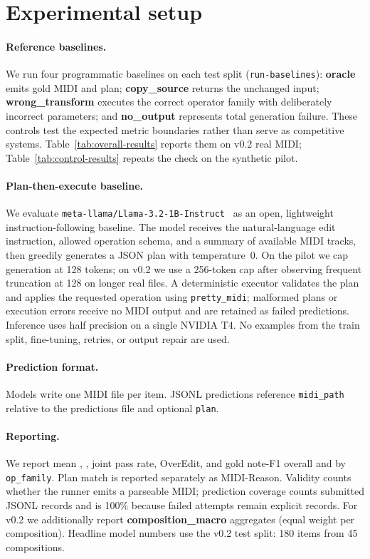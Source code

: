 \section{Experimental setup}

\paragraph{Reference baselines.}
We run four programmatic baselines on each test split (\texttt{run-baselines}): \textbf{oracle} emits gold MIDI and plan; \textbf{copy\_source} returns the unchanged input; \textbf{wrong\_transform} executes the correct operator family with deliberately incorrect parameters; and \textbf{no\_output} represents total generation failure. These controls test the expected metric boundaries rather than serve as competitive systems. Table~\ref{tab:overall-results} reports them on v0.2 real MIDI; Table~\ref{tab:control-results} repeats the check on the synthetic pilot.

\paragraph{Plan-then-execute baseline.}
We evaluate \texttt{meta-llama/Llama-3.2-1B-Instruct}~\cite{dubey2024llama3} as an open, lightweight instruction-following baseline. The model receives the natural-language edit instruction, allowed operation schema, and a summary of available MIDI tracks, then greedily generates a JSON plan with temperature~0. On the pilot we cap generation at 128 tokens; on v0.2 we use a 256-token cap after observing frequent truncation at 128 on longer real files. A deterministic executor validates the plan and applies the requested operation using \texttt{pretty\_midi}; malformed plans or execution errors receive no MIDI output and are retained as failed predictions. Inference uses half precision on a single NVIDIA T4. No examples from the train split, fine-tuning, retries, or output repair are used.

\paragraph{Prediction format.}
Models write one MIDI file per item. JSONL predictions reference \texttt{midi\_path} relative to the predictions file and optional \texttt{plan}.

\paragraph{Reporting.}
We report mean \edit{}, \preserve{}, joint pass rate, OverEdit, and gold note-F1 overall and by \texttt{op\_family}. Plan match is reported separately as MIDI-Reason. Validity counts whether the runner emits a parseable MIDI; prediction coverage counts submitted JSONL records and is 100\% because failed attempts remain explicit records. For v0.2 we additionally report \textbf{composition\_macro} aggregates (equal weight per composition). Headline model numbers use the v0.2 test split: 180 items from 45 compositions.

